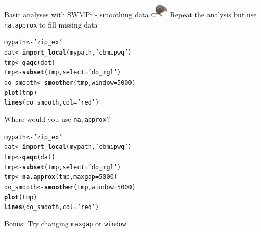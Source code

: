\documentclass[xcolor=dvipsnames]{beamer}\usepackage[]{graphicx}\usepackage[]{color}
\makeatletter
\newcommand{\hlnum}[1]{\textcolor[rgb]{0.686,0.059,0.569}{#1}}%
\newcommand{\hlstr}[1]{\textcolor[rgb]{0.192,0.494,0.8}{#1}}%
\newcommand{\hlstd}[1]{\textcolor[rgb]{0.345,0.345,0.345}{#1}}%
\newcommand{\hlkwb}[1]{\textcolor[rgb]{0.69,0.353,0.396}{#1}}%
\newcommand{\hlkwc}[1]{\textcolor[rgb]{0.333,0.667,0.333}{#1}}%
\newcommand{\hlkwd}[1]{\textcolor[rgb]{0.737,0.353,0.396}{\textbf{#1}}}%
\newenvironment{kframe}{%
 \def\at@end@of@kframe{}%
 \ifinner\ifhmode%
  \def\at@end@of@kframe{\end{minipage}}%
  \begin{minipage}{\columnwidth}%
 \fi\fi%
 \def\FrameCommand##1{\hskip\@totalleftmargin \hskip-\fboxsep
 \colorbox{shadecolor}{##1}\hskip-\fboxsep
     \hskip-\linewidth \hskip-\@totalleftmargin \hskip\columnwidth}%
 \MakeFramed {\advance\hsize-\width
   \@totalleftmargin\z@ \linewidth\hsize
   \@setminipage}}%
 {\par\unskip\endMakeFramed%
 \at@end@of@kframe}
\newenvironment{knitrout}{}{} %
\makeatother
\begin{document}
\begin{frame}[fragile,t]{Basic analyses with SWMPr - smoothing data \includegraphics[width = 0.065\textwidth]{imgs/swmprat.png}}
\onslide<+->
Repeat the analysis but use \texttt{na.approx} to fill missing data
\begin{knitrout}\scriptsize
{}\color{fgcolor}\begin{kframe}
\begin{alltt}
\hlstd{mypath} \hlkwb{<-} \hlstr{'zip_ex'}
\hlstd{dat} \hlkwb{<-} \hlkwd{import_local}\hlstd{(mypath,} \hlstr{'cbmipwq'}\hlstd{)}
\hlstd{tmp} \hlkwb{<-} \hlkwd{qaqc}\hlstd{(dat)}
\hlstd{tmp} \hlkwb{<-} \hlkwd{subset}\hlstd{(tmp,} \hlkwc{select} \hlstd{=} \hlstr{'do_mgl'}\hlstd{)}
\hlstd{do_smooth} \hlkwb{<-} \hlkwd{smoother}\hlstd{(tmp,} \hlkwc{window} \hlstd{=} \hlnum{5000}\hlstd{)}
\hlkwd{plot}\hlstd{(tmp)}
\hlkwd{lines}\hlstd{(do_smooth,} \hlkwc{col} \hlstd{=} \hlstr{'red'}\hlstd{)}
\end{alltt}
\end{kframe}
\end{knitrout}
Where would you use \texttt{na.approx}?
\onslide<+->
\begin{knitrout}\scriptsize
{}\color{fgcolor}\begin{kframe}
\begin{alltt}
\hlstd{mypath} \hlkwb{<-} \hlstr{'zip_ex'}
\hlstd{dat} \hlkwb{<-} \hlkwd{import_local}\hlstd{(mypath,} \hlstr{'cbmipwq'}\hlstd{)}
\hlstd{tmp} \hlkwb{<-} \hlkwd{qaqc}\hlstd{(dat)}
\hlstd{tmp} \hlkwb{<-} \hlkwd{subset}\hlstd{(tmp,} \hlkwc{select} \hlstd{=} \hlstr{'do_mgl'}\hlstd{)}
\hlstd{tmp} \hlkwb{<-} \hlkwd{na.approx}\hlstd{(tmp,} \hlkwc{maxgap} \hlstd{=} \hlnum{5000}\hlstd{)}
\hlstd{do_smooth} \hlkwb{<-} \hlkwd{smoother}\hlstd{(tmp,} \hlkwc{window} \hlstd{=} \hlnum{5000}\hlstd{)}
\hlkwd{plot}\hlstd{(tmp)}
\hlkwd{lines}\hlstd{(do_smooth,} \hlkwc{col} \hlstd{=} \hlstr{'red'}\hlstd{)}
\end{alltt}
\end{kframe}
\end{knitrout}
\onslide<+->
Bonus: Try changing \texttt{maxgap} or \texttt{window}
\end{frame}
\end{document}
